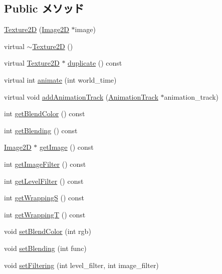 \subsection*{Public メソッド}
\begin{CompactItemize}
\item 
\hyperlink{classm3g_1_1Texture2D_7a8d6431e41022e29ac936afc5e97b8e}{Texture2D} (\hyperlink{classm3g_1_1Image2D}{Image2D} $\ast$image)
\item 
virtual \hyperlink{classm3g_1_1Texture2D_060332aea614a81a914cd2e55f1794df}{$\sim$Texture2D} ()
\item 
virtual \hyperlink{classm3g_1_1Texture2D}{Texture2D} $\ast$ \hyperlink{classm3g_1_1Texture2D_f4b50abcea8e4a6d6981c779d5009c05}{duplicate} () const 
\item 
virtual int \hyperlink{classm3g_1_1Texture2D_8aad1ceab4c2a03609c8a42324ce484d}{animate} (int world\_\-time)
\item 
virtual void \hyperlink{classm3g_1_1Texture2D_415c0b110f95410ded9b85e5d99a496b}{addAnimationTrack} (\hyperlink{classm3g_1_1AnimationTrack}{AnimationTrack} $\ast$animation\_\-track)
\item 
int \hyperlink{classm3g_1_1Texture2D_b7dc7b7bf2934448281894f2c1ef3638}{getBlendColor} () const 
\item 
int \hyperlink{classm3g_1_1Texture2D_078954de3d786bd11dc98b06f237bbbb}{getBlending} () const 
\item 
\hyperlink{classm3g_1_1Image2D}{Image2D} $\ast$ \hyperlink{classm3g_1_1Texture2D_a8c0193b0e7d47d4b5c9f60df24c44f5}{getImage} () const 
\item 
int \hyperlink{classm3g_1_1Texture2D_7b1e1ea0acc3d2096d346afdecc2ea5f}{getImageFilter} () const 
\item 
int \hyperlink{classm3g_1_1Texture2D_039f7813e846bedec1aaf4c413c15924}{getLevelFilter} () const 
\item 
int \hyperlink{classm3g_1_1Texture2D_6bdb583791178dc5002f4d0ae88293a9}{getWrappingS} () const 
\item 
int \hyperlink{classm3g_1_1Texture2D_58375e5e8ddde63dcf74f882d053ae3f}{getWrappingT} () const 
\item 
void \hyperlink{classm3g_1_1Texture2D_b5a6333203f443fb1f66ea2e39d4de1b}{setBlendColor} (int rgb)
\item 
void \hyperlink{classm3g_1_1Texture2D_189d98ce3e8ac7590be771944b3186d4}{setBlending} (int func)
\item 
void \hyperlink{classm3g_1_1Texture2D_857574b5c0f3e0ca9239bafb4008cae1}{setFiltering} (int level\_\-filter, int image\_\-filter)

\end{CompactItemize}
